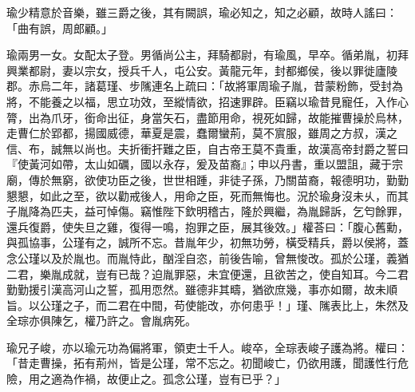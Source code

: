 \begin{pinyinscope}
瑜少精意於音樂，雖三爵之後，其有闕誤，瑜必知之，知之必顧，故時人謠曰：「曲有誤，周郎顧。」

瑜兩男一女。女配太子登。男循尚公主，拜騎都尉，有瑜風，早卒。循弟胤，初拜興業都尉，妻以宗女，授兵千人，屯公安。黃龍元年，封都鄉侯，後以罪徙廬陵郡。赤烏二年，諸葛瑾、步隲連名上疏曰：「故將軍周瑜子胤，昔蒙粉飾，受封為將，不能養之以福，思立功效，至縱情欲，招速罪辟。臣竊以瑜昔見寵任，入作心膂，出為爪牙，銜命出征，身當矢石，盡節用命，視死如歸，故能摧曹操於烏林，走曹仁於郢都，揚國威德，華夏是震，蠢爾蠻荊，莫不賔服，雖周之方叔，漢之信、布，誠無以尚也。夫折衝扞難之臣，自古帝王莫不貴重，故漢高帝封爵之誓曰『使黃河如帶，太山如礪，國以永存，爰及苗裔』；申以丹書，重以盟詛，藏于宗廟，傳於無窮，欲使功臣之後，世世相踵，非徒子孫，乃關苗裔，報德明功，勤勤懇懇，如此之至，欲以勸戒後人，用命之臣，死而無悔也。況於瑜身沒未乆，而其子胤降為匹夫，益可悼傷。竊惟陛下欽明稽古，隆於興繼，為胤歸訴，乞匄餘罪，還兵復爵，使失旦之雞，復得一鳴，抱罪之臣，展其後效。」權荅曰：「腹心舊勳，與孤協事，公瑾有之，誠所不忘。昔胤年少，初無功勞，橫受精兵，爵以侯將，蓋念公瑾以及於胤也。而胤恃此，酗淫自恣，前後告喻，曾無悛改。孤於公瑾，義猶二君，樂胤成就，豈有已哉？迫胤罪惡，未宜便還，且欲苦之，使自知耳。今二君勤勤援引漢高河山之誓，孤用恧然。雖德非其疇，猶欲庶幾，事亦如爾，故未順旨。以公瑾之子，而二君在中間，苟使能改，亦何患乎！」瑾、隲表比上，朱然及全琮亦俱陳乞，權乃許之。會胤病死。

瑜兄子峻，亦以瑜元功為偏將軍，領吏士千人。峻卒，全琮表峻子護為將。權曰：「昔走曹操，拓有荊州，皆是公瑾，常不忘之。初聞峻亡，仍欲用護，聞護性行危險，用之適為作禍，故便止之。孤念公瑾，豈有已乎？」


\end{pinyinscope}